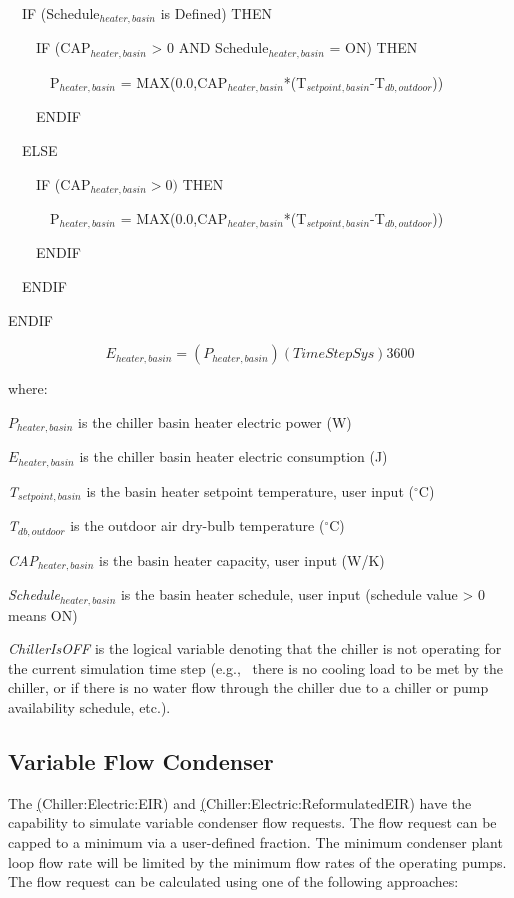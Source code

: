 ~~IF (Schedule\(_{heater,basin}\) is Defined) THEN

~~~~IF (CAP\(_{heater,basin}\) > 0 AND Schedule\(_{heater,basin}\) = ON) THEN

~~~~~~P\(_{heater,basin}\) = MAX(0.0,CAP\(_{heater,basin}\)*(T\(_{setpoint,basin}\)-T\(_{db,outdoor}\)))

~~~~ENDIF

~~ELSE

~~~~IF (CAP\(_{heater,basin} > 0)\) THEN

~~~~~~P\(_{heater,basin}\) = MAX(0.0,CAP\(_{heater,basin}\)*(T\(_{setpoint,basin}\)-T\(_{db,outdoor}\)))

~~~~ENDIF

~~ENDIF

ENDIF

\begin{equation}
{E_{heater,basin}} = \left( {{P_{heater,basin}}} \right)\left( {TimeStepSys} \right)3600
\end{equation}

where:

\({P_{heater,basin}}\) is the chiller basin heater electric power (W)

\({E_{heater,basin}}\) is the chiller basin heater electric consumption (J)

\emph{T\(_{setpoint,basin}\)} is the basin heater setpoint temperature, user input (\(^{\circ}\)C)

\emph{T\(_{db,outdoor}\)} is the outdoor air dry-bulb temperature (\(^{\circ}\)C)

\emph{CAP\(_{heater,basin}\)} is the basin heater capacity, user input (W/K)

\emph{Schedule\(_{heater,basin}\)} is the basin heater schedule, user input (schedule value \textgreater{} 0 means ON)

\emph{ChillerIsOFF} is the logical variable denoting that the chiller is not operating for the current simulation time step (e.g.,~ there is no cooling load to be met by the chiller, or if there is no water flow through the chiller due to a chiller or pump availability schedule, etc.). 

\subsection{Variable Flow Condenser}\label{variable-flow-condenser}

The \hyperref[electric-chiller-model-based-on-condenser-entering-temperature](Chiller:Electric:EIR) and \hyperref[electric-chiller-model-based-on-condenser-leaving-temperature](Chiller:Electric:ReformulatedEIR) have the capability to simulate variable condenser flow requests. The flow request can be capped to a minimum via a user-defined fraction. The minimum condenser plant loop flow rate will be limited by the minimum flow rates of the operating pumps. The flow request can be calculated using one of the following approaches:

